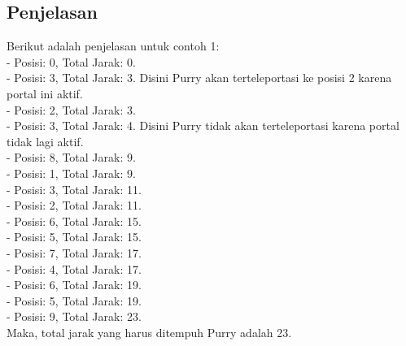 \documentclass{article}
\begin{document}
\subsection*{Penjelasan}

Berikut adalah penjelasan untuk contoh 1: \\
- Posisi: 0, Total Jarak: 0. \\
- Posisi: 3, Total Jarak: 3. Disini Purry akan terteleportasi ke posisi 2 karena portal ini aktif. \\
- Posisi: 2, Total Jarak: 3. \\
- Posisi: 3, Total Jarak: 4. Disini Purry tidak akan terteleportasi karena portal tidak lagi aktif. \\
- Posisi: 8, Total Jarak: 9. \\
- Posisi: 1, Total Jarak: 9. \\
- Posisi: 3, Total Jarak: 11. \\
- Posisi: 2, Total Jarak: 11. \\
- Posisi: 6, Total Jarak: 15. \\
- Posisi: 5, Total Jarak: 15. \\
- Posisi: 7, Total Jarak: 17. \\
- Posisi: 4, Total Jarak: 17. \\
- Posisi: 6, Total Jarak: 19. \\
- Posisi: 5, Total Jarak: 19. \\
- Posisi: 9, Total Jarak: 23. \\

Maka, total jarak yang harus ditempuh Purry adalah 23.
\end{document}
